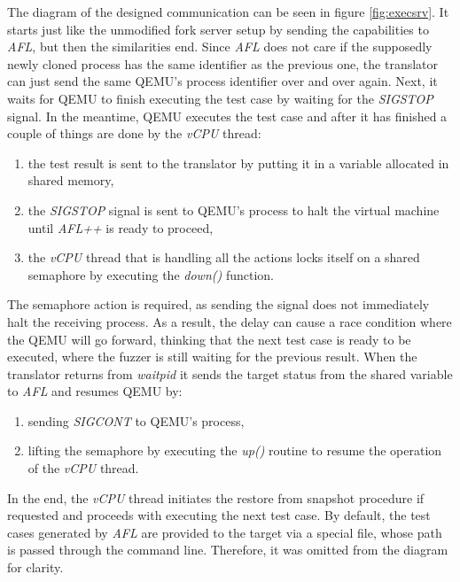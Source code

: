 The diagram of the designed communication can be seen in figure \ref{fig:execsrv}. It starts just like the unmodified fork server setup by sending the capabilities to \textit{AFL}, but then the similarities end. Since \textit{AFL} does not care if the supposedly newly cloned process has the same identifier as the previous one, the translator can just send the same QEMU's process identifier over and over again. Next, it waits for QEMU to finish executing the test case by waiting for the \textit{SIGSTOP} signal. In the meantime, QEMU executes the test case and after it has finished a couple of things are done by the \textit{vCPU} thread:
\begin{enumerate}
    \item the test result is sent to the translator by putting it in a variable allocated in shared memory,
    \item the \textit{SIGSTOP} signal is sent to QEMU's process to halt the virtual machine until \textit{AFL++} is ready to proceed,
    \item the \textit{vCPU} thread that is handling all the actions locks itself on a shared semaphore by executing the \textit{down()} function.
\end{enumerate}
The semaphore action is required, as sending the signal does not immediately halt the receiving process. As a result, the delay can cause a race condition where the QEMU will go forward, thinking that the next test case is ready to be executed, where the fuzzer is still waiting for the previous result. When the translator returns from \textit{waitpid} it sends the target status from the shared variable to \textit{AFL} and resumes QEMU by:
\begin{enumerate}
    \item sending \textit{SIGCONT} to QEMU's process,
    \item lifting the semaphore by executing the \textit{up()} routine to resume the operation of the \textit{vCPU} thread.
\end{enumerate}
In the end, the \textit{vCPU} thread initiates the restore from snapshot procedure if requested and proceeds with executing the next test case. By default, the test cases generated by \textit{AFL} are provided to the target via a special file, whose path is passed through the command line. Therefore, it was omitted from the diagram for clarity.

